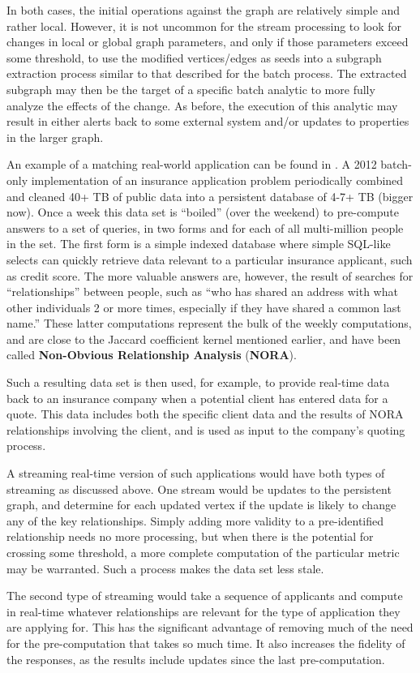 In both cases, the initial operations against the graph are relatively simple and rather local. However, it is not uncommon for the stream processing to look for changes in local or global graph parameters, and only if those parameters exceed some threshold, to use the modified vertices/edges as seeds into a subgraph extraction process similar to that described for the batch process. The extracted subgraph may then be the target of a specific batch analytic to more fully analyze the effects of the change. As before, the execution of this analytic may result in either alerts back to some external system and/or updates to properties in the larger graph.

An example of a  matching real-world application can be found in \cite{kogge-ref:NORA}. A 2012 batch-only implementation of an insurance application problem periodically combined and cleaned 40+ TB of public data into a persistent database of 4-7+ TB (bigger now). Once a week this data set is ``boiled'' (over the weekend) to pre-compute answers to a set of queries, in two forms and for each of all multi-million people in the set. The first form is a simple indexed database where simple SQL-like selects can quickly retrieve data relevant to a particular insurance applicant, such as credit score. The more valuable answers are, however, the result of searches for ``relationships'' between people, such as ``who has shared an address with what other individuals 2 or more times, especially if they have shared a common last name.'' These latter computations represent the bulk of the weekly computations, and are close to the Jaccard coefficient kernel mentioned earlier, and have been called \textbf{Non-Obvious Relationship Analysis} (\textbf{NORA}).

Such a resulting data set is then used, for example, to provide real-time data back to an insurance company when a potential client has entered data for a quote. This data includes both the specific client data and the results of NORA relationships involving the client, and is used as input to the company's quoting process.

A streaming real-time version of such applications would have both types of streaming as discussed above. One stream would be updates to the persistent graph, and determine for each updated vertex if the update is likely to change any of the key relationships. Simply adding more validity to a pre-identified relationship needs no more processing, but when there is the potential for crossing some threshold, a more complete computation of the particular metric may be warranted. Such a process makes the data set less stale.

The second type of streaming would take a sequence of applicants and compute in real-time whatever relationships are relevant for the type of application they are applying for. This has the significant advantage of removing much of the need for the pre-computation that takes so much time. It also increases the fidelity of the responses, as the results include updates since the last pre-computation.
